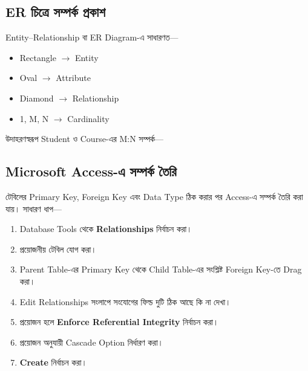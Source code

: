 
\subsection{ER চিত্রে সম্পর্ক প্রকাশ}

Entity--Relationship বা ER Diagram-এ সাধারণত---

\begin{itemize}
    \item Rectangle $\rightarrow$ Entity
    \item Oval $\rightarrow$ Attribute
    \item Diamond $\rightarrow$ Relationship
    \item 1, M, N $\rightarrow$ Cardinality
\end{itemize}


উদাহরণস্বরূপ Student ও Course-এর M:N সম্পর্ক---

\begin{flushleft}\centering\captionsetup{justification=centering}

\end{flushleft}



\subsection{Microsoft Access-এ সম্পর্ক তৈরি}

টেবিলের Primary Key, Foreign Key এবং Data Type ঠিক করার পর
Access-এ সম্পর্ক তৈরি করা যায়। সাধারণ ধাপ---

\begin{enumerate}
    \item Database Tools থেকে \textbf{Relationships} নির্বাচন করা।
    \item প্রয়োজনীয় টেবিল যোগ করা।
    \item Parent Table-এর Primary Key থেকে Child Table-এর সংশ্লিষ্ট
          Foreign Key-তে Drag করা।
    \item Edit Relationships সংলাপে সংযোগের ফিল্ড দুটি ঠিক আছে কি না দেখা।
    \item প্রয়োজন হলে \textbf{Enforce Referential Integrity} নির্বাচন করা।
    \item প্রয়োজন অনুযায়ী Cascade Option নির্ধারণ করা।
    \item \textbf{Create} নির্বাচন করা।
\end{enumerate}


